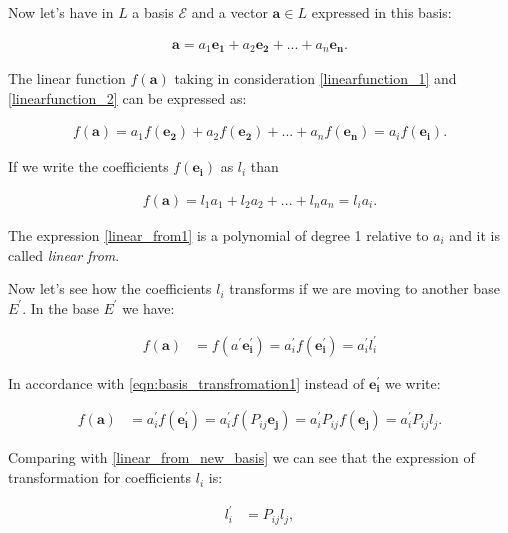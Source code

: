 \documentclass{book}
\begin{document}
Now let's have in $L$ a basis $\mathscr{E}$ and a vector $\boldsymbol{a} \in L$ expressed in this basis:

\begin{align*}
\boldsymbol{a} = a_1\boldsymbol{e_1} + a_2\boldsymbol{e_2} + ... + a_n\boldsymbol{e_n}.
\end{align*}

The linear function $f(\boldsymbol{a})$ taking in consideration \eqref{linearfunction_1} and \eqref{linearfunction_2} can be expressed as:

\begin{align*}
f(\boldsymbol{a}) = a_{1}f(\boldsymbol{e_2}) + a_{2}f(\boldsymbol{e_2}) + ... + a_{n}f(\boldsymbol{e_n}) = a_if(\boldsymbol{e_i}). \label{linear_from0}
\end{align*}

If we write the coefficients $f(\boldsymbol{e_i})$ as $l_i$ than

\begin{align}
f(\boldsymbol{a}) = l_{1}a_{1} + l_{2}a_{2} + ... + l_{n}a_{n} = l_{i}a_{i}. \label{linear_from1}
\end{align}

The expression \eqref{linear_from1} is a polynomial of degree 1 relative to $a_i$ and it is called \emph{linear from}.

Now let's see how the coefficients $l_i$ transforms if we are moving to another base $E^'$. In the base $E^'$ we have:

\begin{align}
f(\boldsymbol{a}) &= f(a^{'}\boldsymbol{e^{'}_i}) = a^{'}_if(\boldsymbol{e^{'}_i}) = a^{'}_{i}l^{'}_i \label{linear_from_new_basis}
\end{align}

In accordance with \eqref{eqn:basis_transfromation1} instead of $\boldsymbol{e^{'}_i}$ we write:

\begin{align*}
f(\boldsymbol{a}) &= a^{'}_if(\boldsymbol{e^{'}_i}) = a^{'}_if(P_{ij}\boldsymbol{e_j}) =  a^{'}_iP_{ij}f(\boldsymbol{e_j}) = a^{'}_iP_{ij}l_j.\label{linear_from0}
\end{align*}

Comparing with \eqref{linear_from_new_basis} we can see that the expression of transformation for coefficients $l_i$ is:

\begin{align}
l_i^{'}&= P_{ij}l_j,\label{covariant_transformation}
\end{align}
\end{document}
